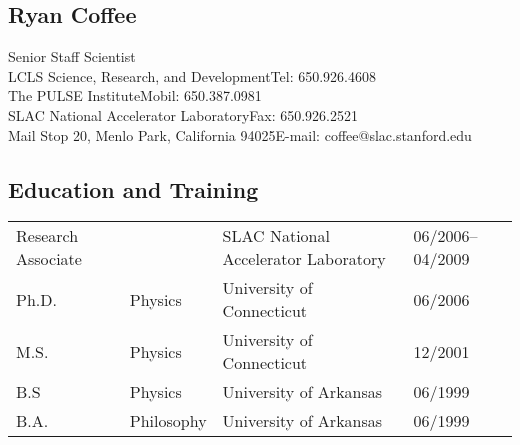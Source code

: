 \subsection*{Ryan Coffee}
Senior Staff Scientist\\
LCLS Science, Research, and Development\hfill Tel: 650.926.4608\\
The PULSE Institute\hfill Mobil: 650.387.0981\\
SLAC National Accelerator Laboratory\hfill Fax: 650.926.2521\\
Mail Stop 20, Menlo Park, California  94025\hfill E-mail: coffee@slac.stanford.edu\\

\subsection*{Education and Training}
\begin{tabular}{llll}
Research Associate & & SLAC National Accelerator Laboratory & 06/2006--04/2009\\
Ph.D. & Physics & University of Connecticut & 06/2006\\
M.S. & Physics & University of Connecticut & 12/2001\\
B.S & Physics & University of Arkansas & 06/1999\\
B.A. & Philosophy & University of Arkansas & 06/1999
\end{tabular}

